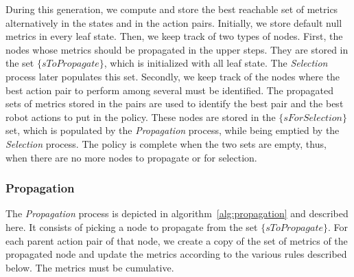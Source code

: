 During this generation, we compute and store the best reachable set of metrics alternatively in the states and in the action pairs. Initially, we store default null metrics in every leaf state. Then, we keep track of two types of nodes. First, the nodes whose metrics should be propagated in the upper steps. They are stored in the set $\{sToPropagate\}$, which is initialized with all leaf state. The \textit{Selection} process later populates this set. Secondly, we keep track of the nodes where the best action pair to perform among several must be identified. The propagated sets of metrics stored in the pairs are used to identify the best pair and the best robot actions to put in the policy. These nodes are stored in the $\{sForSelection\}$ set, which is populated by the \textit{Propagation} process, while being emptied by the \textit{Selection} process. The policy is complete when the two sets are empty, thus, when there are no more nodes to propagate or for selection.

    \subsubsection*{Propagation}

The \textit{Propagation} process is depicted in algorithm~\ref{alg:propagation} and described here. It consists of picking a node to propagate from the set $\{sToPropagate\}$. For each parent action pair of that node, we create a copy of the set of metrics of the propagated node and update the metrics according to the various rules described below.
The metrics must be cumulative. 

